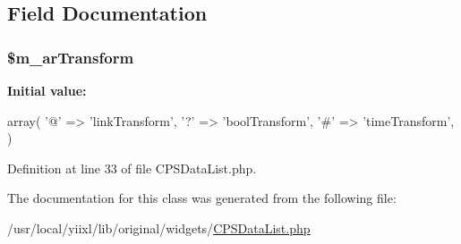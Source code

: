 \subsection{Field Documentation}
\hypertarget{classCPSDataList_a02daa717c378ec40ccd5c56792be79b6}{
\subsubsection[{\$m\_\-arTransform}]{\setlength{\rightskip}{0pt plus 5cm}\$m\_\-arTransform}}
\label{classCPSDataList_a02daa717c378ec40ccd5c56792be79b6}
{\bfseries Initial value:}
\begin{DoxyCode}
 array(
        '@' => 'linkTransform',
        '?' => 'boolTransform',
        '#' => 'timeTransform',
    )
\end{DoxyCode}


Definition at line 33 of file CPSDataList.php.



The documentation for this class was generated from the following file:\begin{DoxyCompactItemize}
\item 
/usr/local/yiixl/lib/original/widgets/\hyperlink{CPSDataList_8php}{CPSDataList.php}\end{DoxyCompactItemize}
